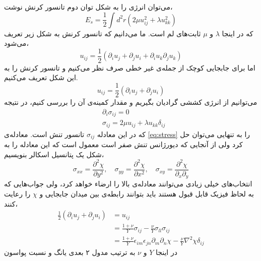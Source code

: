 می‌توان انرژی را به شکل توان دوم تانسور کرنش نوشت،
\begin{equation}
E_s=\frac{1}{2}\int d^2r(2\mu u_{ij}^2+\lambda u_{kk}^2)
\label{eq:energylame}
\end{equation}
که در اینجا $\lambda$
و $\mu$
ثابت‌های لم
است. ما می‌دانیم که تانسور کرنش به شکل زیر تعریف می‌شود،
\begin{equation}
u_{ij}=\frac{1}{2}(\partial_i u_j+\partial_j u_i+\partial_i u_k\partial_j u_k)
\end{equation}
اما برای جابجایی کوچک از جمله‌ی غیر خطی صرف نظر می‌کنیم و تانسور کرنش را به این شکل تعریف می‌کنیم.
\begin{equation}
u_{ij}=\frac{1}{2}(\partial_i u_j+\partial_j u_i)
\label{eq:simplestrain}
\end{equation}
می‌توانیم  از انرژی کششی گرادیان بگیریم و مقدار کمینه‌ی آن را بررسی کنیم، در نتیجه
\begin{equation}
\begin{aligned}
&\partial_i\sigma_{ij}=0\\
&\sigma_{ij}=2\mu u_{ij}+\lambda u_{kk}\delta_{ij}
\label{eq:stress}
\end{aligned}
\end{equation}
که در این معادله 
$\sigma_{ij}$
تانسور تنش است. معادله‌ی 
\ref{eq:stress}
را به تنهایی می‌توان حل کرد ولی از آنجایی که دیورژانس تنش صفر است معمول است که این معادله را به شکل یک پتانسیل اسکالر بنویسیم،
\begin{equation}
\sigma_{xx}=\frac{\partial^2\chi}{\partial y^2},\quad\sigma_{yy}=\frac{\partial^2\chi}{\partial x^2},\quad\sigma_{xy}=\frac{\partial^2\chi}{\partial_x\partial_y} 
\end{equation}
انتخاب‌های خیلی زیادی می‌توانند معادله‌ی بالا را ارضاء خواهد کرد، ولی جواب‌هایی که به لحاظ فیزیک قابل قبول هستند باید بتوانند رابطه‌ی بین میدان جابجایی و 
$\chi$
را رعایت کنند،
\begin{equation}
\begin{aligned}
\frac{1}{2}(\partial_iu_j+\partial_ju_i)&=u_{ij}\\
&=\frac{1+\nu}{Y}\sigma_{ij}-\frac{\nu}{Y}\sigma_{ll}\sigma_{ij}\\
&=\frac{1+\nu}{Y}\epsilon_{im}\epsilon_{jn}\partial_{m}\partial_{n}\chi-\frac{\nu}{Y}\nabla^2\chi\delta_{ij}
\label{eq:constraint}
\end{aligned}
\end{equation}
در اینجا $Y$
و $\nu$
به ترتیب مدول ۲ بعدی یانگ
 و نسبت پواسون
